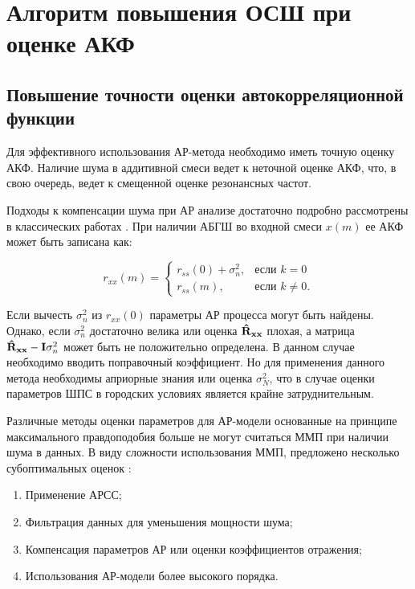 \chapter{Алгоритм повышения ОСШ при оценке АКФ}

\section{Повышение точности оценки автокорреляционной функции}
Для эффективного использования АР-метода необходимо иметь точную оценку АКФ. Наличие шума в аддитивной смеси ведет к неточной
оценке АКФ, что, в свою очередь, ведет к смещенной оценке резонансных частот.

Подходы к компенсации шума при АР анализе достаточно подробно рассмотрены в классических работах \cite{kay_ar_book, kay_noise_compensation}.
При наличии АБГШ во входной смеси ${x(m)}$ ее АКФ может быть записана как:
\begin{center}
\begin{equation}
	\label{eq:acf_noise_basic}
	r_{xx}(m) =	\begin{cases}
				r_{ss}(0) + \sigma_n^2, & \mbox{если } k=0 \\
				r_{ss}(m), & \mbox{если } k \ne 0.
			\end{cases}
\end{equation}
\end{center}

Если вычесть ${\sigma_n^2}$ из ${r_{xx}(0)}$ параметры АР процесса могут быть найдены. Однако, если ${\sigma_n^2}$ достаточно велика или 
оценка ${{\bf{\hat{R}_{xx}}}}$ плохая, а матрица ${{\bf{\hat{R}_{xx}}} - {\bf{I}}\sigma_n^2}$ может быть не положительно определена. В данном
случае необходимо вводить поправочный коэффициент. Но для применения данного метода необходимы априорные знания или оценка ${\sigma_N^2}$,
что в случае оценки параметров ШПС в городских условиях является крайне затруднительным.

Различные методы оценки параметров для АР-модели основанные на принципе максимального правдоподобия больше не
могут считаться ММП при наличии шума в данных. В виду сложности использования ММП, предложено несколько 
субоптимальных оценок \cite{marpl_book, kay_ar_book}:
\begin{enumerate}
	\item Применение АРСС;
	\item Фильтрация данных для уменьшения мощности шума;
	\item Компенсация параметров АР или оценки коэффициентов отражения;
	\item Использования АР-модели более высокого порядка.
\end{enumerate}

